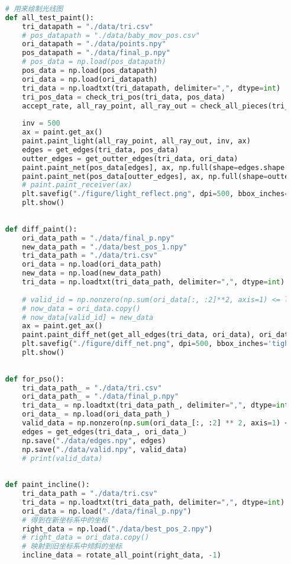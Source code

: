\documentclass[withoutpreface,bwprint,fontset=macnew]{cumcmthesis} %
\begin{document}
\begin{appendices}
\begin{lstlisting}[language=python]
	
	# 用来绘制光线图
	def all_test_paint():
	    tri_datapath = "./data/tri.csv"
	    # pos_datapath = "./data/baby_mov_pos.csv"
	    ori_datapath = "./data/points.npy"
	    pos_datapath = "./data/final_p.npy"
	    # pos_data = np.load(pos_datapath)
	    pos_data = np.load(pos_datapath)
	    ori_data = np.load(ori_datapath)
	    tri_data = np.loadtxt(tri_datapath, delimiter=",", dtype=int)
	    tri_pos_data = check_tri_pos(tri_data, pos_data)
	    accept_rate, all_ray_point, all_ray_out = check_all_pieces(tri_pos_data)
	
	    inv = 500
	    ax = paint.get_ax()
	    paint.paint_light(all_ray_point, all_ray_out, inv, ax)
	    edges = get_edges(tri_data, pos_data)
	    outter_edges = get_outter_edges(tri_data, ori_data)
	    paint.paint_net(pos_data[edges], ax, np.full(shape=edges.shape[0], fill_value=10))
	    paint.paint_net(pos_data[outter_edges], ax, np.full(shape=outter_edges.shape[0], fill_value=9))
	    # paint.paint_receiver(ax)
	    plt.savefig("./figure/light_reflect.png", dpi=500, bbox_inches='tight')
	    plt.show()
	
	
	def diff_paint():
	    ori_data_path = "./data/final_p.npy"
	    new_data_path = "./data/best_pos_1.npy"
	    tri_data_path = "./data/tri.csv"
	    ori_data = np.load(ori_data_path)
	    new_data = np.load(new_data_path)
	    tri_data = np.loadtxt(tri_data_path, delimiter=",", dtype=int)
	
	    # valid_id = np.nonzero(np.sum(ori_data[:, :2]**2, axis=1) <= lim)[0]
	    # now_data = ori_data.copy()
	    # now_data[valid_id] = new_data
	    ax = paint.get_ax()
	    paint.paint_diff_net(get_all_edges(tri_data, ori_data), ori_data, new_data, 100, ax)
	    plt.savefig("./figure/diff_net.png", dpi=500, bbox_inches='tight')
	    plt.show()
	
	
	def for_pso():
	    tri_data_path_ = "./data/tri.csv"
	    ori_data_path_ = "./data/final_p.npy"
	    tri_data_ = np.loadtxt(tri_data_path_, delimiter=",", dtype=int)
	    ori_data_ = np.load(ori_data_path_)
	    valid_data = np.nonzero(np.sum(ori_data_[:, :2] ** 2, axis=1) <= lim)[0]
	    edges = get_edges(tri_data_, ori_data_)
	    np.save("./data/edges.npy", edges)
	    np.save("./data/valid.npy", valid_data)
	    # print(valid_data)
	
	
	def paint_incline():
	    tri_data_path = "./data/tri.csv"
	    tri_data = np.loadtxt(tri_data_path, delimiter=",", dtype=int)
	    ori_data = np.load("./data/final_p.npy")
	    # 得到在新坐标系中的坐标
	    right_data = np.load("./data/best_pos_2.npy")
	    # right_data = ori_data.copy()
	    # 映射到旧坐标系中倾斜的坐标
	    incline_data = rotate_all_point(right_data, -1)
	

\end{lstlisting}
\end{appendices}
\end{document}
